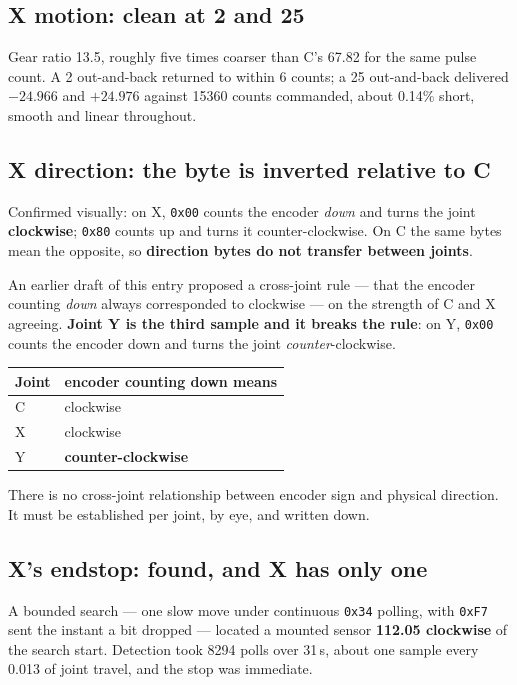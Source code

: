 \documentclass[11pt,letterpaper]{article}
\begin{document}
\subsection{X motion: clean at 2\textdegree{} and 25\textdegree{}}
Gear ratio 13.5, roughly five times coarser than C's 67.82 for the same pulse
count. A 2\textdegree{} out-and-back returned to within 6 counts; a
25\textdegree{} out-and-back delivered $-24.966$\textdegree{} and
$+24.976$\textdegree{} against 15360 counts commanded, about 0.14\% short, smooth
and linear throughout.

\subsection{X direction: the byte is inverted relative to C}
Confirmed visually: on X, \texttt{0x00} counts the encoder \emph{down} and turns
the joint \textbf{clockwise}; \texttt{0x80} counts up and turns it
counter-clockwise. On C the same bytes mean the opposite, so \textbf{direction
bytes do not transfer between joints}.

An earlier draft of this entry proposed a cross-joint rule --- that the encoder
counting \emph{down} always corresponded to clockwise --- on the strength of C and
X agreeing. \textbf{Joint Y is the third sample and it breaks the rule}: on Y,
\texttt{0x00} counts the encoder down and turns the joint \emph{counter}-clockwise.

\begin{center}
\begin{tabular}{ll}
\toprule
\textbf{Joint} & \textbf{encoder counting down means} \\ \midrule
C & clockwise \\
X & clockwise \\
Y & \textbf{counter-clockwise} \\
\bottomrule
\end{tabular}
\end{center}

There is no cross-joint relationship between encoder sign and physical direction.
It must be established per joint, by eye, and written down.

\subsection{X's endstop: found, and X has only one}
A bounded search --- one slow move under continuous \texttt{0x34} polling, with
\texttt{0xF7} sent the instant a bit dropped --- located a mounted sensor
\textbf{112.05\textdegree{} clockwise} of the search start. Detection took 8294
polls over 31\,s, about one sample every 0.013\textdegree{} of joint travel, and
the stop was immediate.
\end{document}
